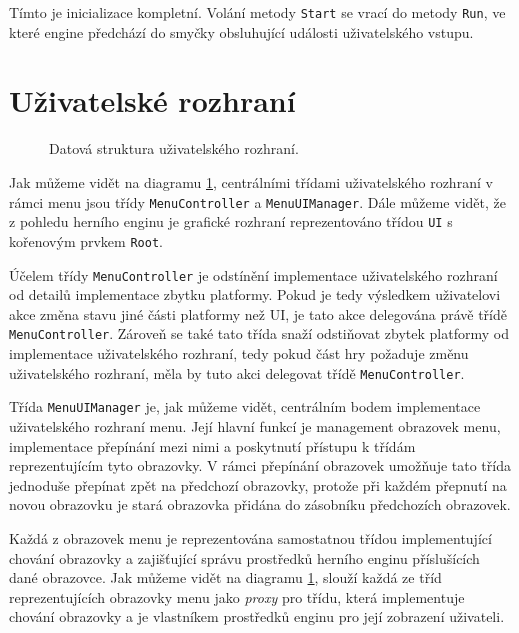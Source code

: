 Tímto je inicializace kompletní. Volání metody \texttt{Start} se vrací do metody \texttt{Run}, ve které engine předchází do smyčky obsluhující události uživatelského vstupu.

\section{Uživatelské rozhraní}
\label{sec:ui}

\begin{figure}[h]
	\centering
	\fontsize{8pt}{11pt}\selectfont
	\def\svgwidth{\textwidth}
	
	\caption{Datová struktura uživatelského rozhraní.}
	\label{fig:uireferences}
\end{figure}

Jak můžeme vidět na diagramu \ref{fig:uireferences}, centrálními třídami uživatelského rozhraní v rámci menu jsou třídy \texttt{MenuController} a \texttt{MenuUIManager}. Dále můžeme vidět, že z pohledu herního enginu je grafické rozhraní reprezentováno třídou \texttt{UI} s kořenovým prvkem \texttt{Root}.

Účelem třídy \texttt{MenuController} je odstínění implementace uživatelského rozhraní od detailů implementace zbytku platformy. Pokud je tedy výsledkem uživatelovi akce změna stavu jiné části platformy než UI, je tato akce delegována právě třídě \texttt{MenuController}. Zároveň se také tato třída snaží odstiňovat zbytek platformy od implementace uživatelského rozhraní, tedy pokud část hry požaduje změnu uživatelského rozhraní, měla by tuto akci delegovat třídě \texttt{MenuController}.

Třída \texttt{MenuUIManager} je, jak můžeme vidět, centrálním bodem implementace uživatelského rozhraní menu. Její hlavní funkcí je management obrazovek menu, implementace přepínání mezi nimi a poskytnutí přístupu k třídám reprezentujícím tyto obrazovky. V rámci přepínání obrazovek umožňuje tato třída jednoduše přepínat zpět na předchozí obrazovky, protože při každém přepnutí na novou obrazovku je stará obrazovka přidána do zásobníku předchozích obrazovek.

Každá z obrazovek menu je reprezentována samostatnou třídou implementující chování obrazovky a zajišťující správu prostředků herního enginu příslušících dané obrazovce. Jak můžeme vidět na diagramu \ref{fig:uireferences}, slouží každá ze tříd reprezentujících obrazovky menu jako \textit{proxy} pro třídu, která implementuje chování obrazovky a je vlastníkem prostředků enginu pro její zobrazení uživateli. 

